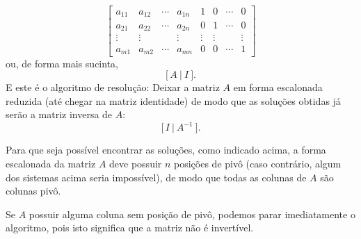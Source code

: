 \begin{equation}
\left[
\begin{array}{cccc|cccc}
a_{11} & a_{12} & \cdots & a_{1n} &   1   &    0   & \cdots &    0 \\
a_{21} & a_{22} & \cdots & a_{2n} &   0   &    1   & \cdots &    0\\
\vdots & \vdots &        & \vdots &   \vdots & \vdots &        & \vdots  \\
a_{m1} & a_{m2} & \cdots & a_{mn} &   0   &    0   & \cdots &    1
\end{array}
\right]
\end{equation} ou, de forma mais sucinta,
\begin{equation}
\big[ \, A \ | \ I \ \big].
\end{equation} E este é o algoritmo de resolução: Deixar a matriz $A$ em forma escalonada reduzida (até chegar na matriz identidade) de modo que as soluções obtidas já serão a matriz inversa de $A$:
\begin{equation}
\big[ \, I \ | \ A^{-1} \ \big].
\end{equation}

\begin{obs}
	Para que seja possível encontrar as soluções, como indicado acima, a forma escalonada da matriz $A$ deve possuir $n$ posições de pivô (caso contrário, algum dos sistemas acima seria impossível), de modo que todas as colunas de $A$ são colunas pivô.

	Se $A$ possuir alguma coluna sem posição de pivô, podemos parar imediatamente o algoritmo, pois isto significa que a matriz não é invertível.
\end{obs}


